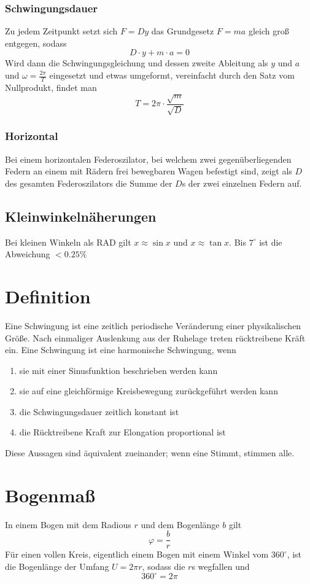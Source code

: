 \documentclass{article}
\begin{document}
\subsubsection*{Schwingungsdauer}
Zu jedem Zeitpunkt setzt sich $F=Dy$ das Grundgesetz $F=ma$ gleich groß entgegen, sodass
\[
 D \cdot y + m \cdot a = 0
\]
Wird dann die Schwingungsgleichung und dessen zweite Ableitung als $y$ und $a$ und $\omega = \frac{2\pi}{T}$ eingesetzt und etwas umgeformt, vereinfacht durch den Satz vom Nullprodukt, findet man
\[
 T = 2\pi \cdot \frac{\sqrt{m}}{\sqrt{D}} 
\]  
 
\subsubsection*{Horizontal}
Bei einem horizontalen Federoszilator, bei welchem zwei gegenüberliegenden Federn an einem mit Rädern frei bewegbaren Wagen befestigt sind, zeigt als $D$ des gesamten Federoszilators die Summe der $D$s der zwei einzelnen Federn auf.  
 
\subsection*{Kleinwinkelnäherungen}
Bei kleinen Winkeln als RAD gilt $x \approx \sin x$ und $x \approx \tan x$. Bis $7^\circ$ ist die Abweichung $< 0.25\%$
 
\section{Definition}
Eine Schwingung ist eine zeitlich periodische Veränderung einer physikalischen Größe. Nach einmaliger Auslenkung aus der Ruhelage treten rücktreibene Kräft ein. \newline
Eine Schwingung ist eine harmonische Schwingung, wenn
\begin{enumerate}
 \item sie mit einer Sinusfunktion beschrieben werden kann
 \item sie auf eine gleichförmige Kreisbewegung zurückgeführt werden kann
 \item die Schwingungsdauer zeitlich konstant ist
 \item die Rücktreibene Kraft zur Elongation proportional ist 
\end{enumerate}  
Diese Aussagen sind äquivalent zueinander; wenn eine Stimmt, stimmen alle. 
 
\section{Bogenmaß}
In einem Bogen mit dem Radious $r$ und dem Bogenlänge $b$ gilt 
\[
 \varphi = \frac{b}{r} 
\]
Für einen vollen Kreis, eigentlich einem Bogen mit einem Winkel vom $360^\circ$, ist die Bogenlänge der Umfang $U=2 \pi r$, sodass die $r$s wegfallen und
\[
 360^\circ = 2\pi
\]
  
\end{document}
